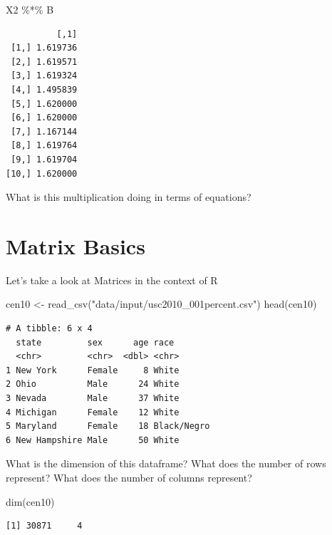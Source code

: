 \documentclass[
  letterpaper,
]{book}
\newenvironment{Shaded}{\begin{snugshade}}{\end{snugshade}}
\newcommand{\FunctionTok}[1]{\textcolor[rgb]{0.28,0.35,0.67}{#1}}
\newcommand{\NormalTok}[1]{\textcolor[rgb]{0.00,0.23,0.31}{#1}}
\newcommand{\OtherTok}[1]{\textcolor[rgb]{0.00,0.23,0.31}{#1}}
\newcommand{\SpecialCharTok}[1]{\textcolor[rgb]{0.37,0.37,0.37}{#1}}
\newcommand{\StringTok}[1]{\textcolor[rgb]{0.13,0.47,0.30}{#1}}
\theoremstyle{definition}
\theoremstyle{definition}
\theoremstyle{plain}
\theoremstyle{definition}
\theoremstyle{plain}
\theoremstyle{plain}
\theoremstyle{remark}
\begin{document}
\begin{Shaded}
\begin{Highlighting}[]
\NormalTok{X2 }\SpecialCharTok{\%*\%}\NormalTok{ B}
\end{Highlighting}
\end{Shaded}

\begin{verbatim}
          [,1]
 [1,] 1.619736
 [2,] 1.619571
 [3,] 1.619324
 [4,] 1.495839
 [5,] 1.620000
 [6,] 1.620000
 [7,] 1.167144
 [8,] 1.619764
 [9,] 1.619704
[10,] 1.620000
\end{verbatim}

What is this multiplication doing in terms of equations?

\hypertarget{matrix-basics}{%
\section{Matrix Basics}\label{matrix-basics}}

Let's take a look at Matrices in the context of R

\begin{Shaded}
\begin{Highlighting}[]
\NormalTok{cen10 }\OtherTok{\textless{}{-}} \FunctionTok{read\_csv}\NormalTok{(}\StringTok{"data/input/usc2010\_001percent.csv"}\NormalTok{)}
\FunctionTok{head}\NormalTok{(cen10)}
\end{Highlighting}
\end{Shaded}

\begin{verbatim}
# A tibble: 6 x 4
  state         sex      age race       
  <chr>         <chr>  <dbl> <chr>      
1 New York      Female     8 White      
2 Ohio          Male      24 White      
3 Nevada        Male      37 White      
4 Michigan      Female    12 White      
5 Maryland      Female    18 Black/Negro
6 New Hampshire Male      50 White      
\end{verbatim}

What is the dimension of this dataframe? What does the number of rows
represent? What does the number of columns represent?

\begin{Shaded}
\begin{Highlighting}[]
\FunctionTok{dim}\NormalTok{(cen10)}
\end{Highlighting}
\end{Shaded}

\begin{verbatim}
[1] 30871     4
\end{verbatim}
\end{document}
